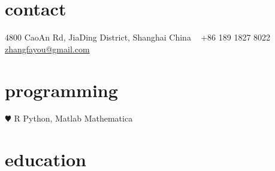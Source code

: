 \documentclass[]{friggeri-cv} %
\begin{document}


\begin{aside} %
\section{contact}
4800 CaoAn Rd,
JiaDing District, Shanghai
China
~
+86 189 1827 8022
~
\href{mailto:zhangfayou@gmail.com}{zhangfayou@gmail.com}
\section{programming}
{\color{red} $\varheartsuit$} R
Python, Matlab Mathematica
\end{aside}


\section{education}
\end{document}
